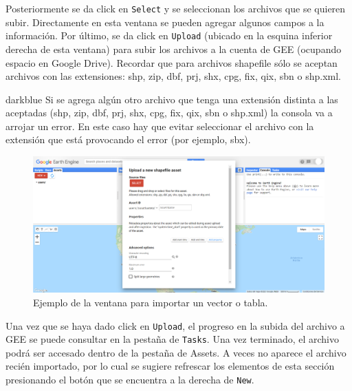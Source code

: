 \documentclass[
  12pt,
  letterpaper,
  twoside]{book}
\begin{document}
Posteriormente se da click en \texttt{Select} y se seleccionan los archivos que se quieren subir. Directamente en esta ventana se pueden agregar algunos campos a la información. Por último, se da click en \texttt{Upload} (ubicado en la esquina inferior derecha de esta ventana) para subir los archivos a la cuenta de GEE (ocupando espacio en Google Drive). Recordar que para archivos shapefile sólo se aceptan archivos con las extensiones: shp, zip, dbf, prj, shx, cpg, fix, qix, sbn o shp.xml.

\begin{bluebox2}

\begin{awesomeblock}{5pt}{\faLightbulb}{darkblue}
Si se agrega algún otro archivo que tenga una extensión distinta a las aceptadas (shp, zip, dbf, prj, shx, cpg, fix, qix, sbn o shp.xml) la consola va a arrojar un error. En este caso hay que evitar seleccionar el archivo con la extensión que está provocando el error (por ejemplo, sbx).

\end{awesomeblock}

\end{bluebox2}

\begin{figure}

{\centering \includegraphics[width=1\linewidth]{Img/Asset2} 

}

\caption{Ejemplo de la ventana para importar un vector o tabla.}\label{fig:unnamed-chunk-167}
\end{figure}

Una vez que se haya dado click en \texttt{Upload}, el progreso en la subida del archivo a GEE se puede consultar en la pestaña de \texttt{Tasks}. Una vez terminado, el archivo podrá ser accesado dentro de la pestaña de Assets. A veces no aparece el archivo recién importado, por lo cual se sugiere refrescar los elementos de esta sección presionando el botón que se encuentra a la derecha de \texttt{New}.
\end{document}
